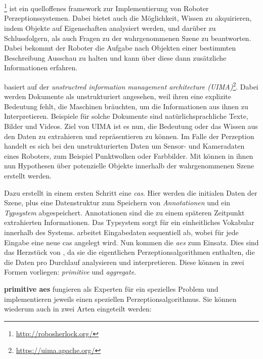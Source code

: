 \section{\robosherlock}
\label{sec:robosherlock}
\robosherlock\footnote{\url{http://robosherlock.org/}} ist ein quelloffenes \gls{framework} zur Implementierung von Roboter Perzeptionssystemen. Dabei bietet \robosherlock auch die Möglichkeit, Wissen zu akquirieren, indem Objekte auf Eigenschaften analysiert werden, und darüber zu Schlussfolgern, als auch Fragen zu der wahrgenommenen Szene zu beantworten. Dabei bekommt der Roboter die Aufgabe nach Objekten einer bestimmten Beschreibung Ausschau zu halten und kann über diese dann zusätzliche Informationen erfahren\cite{robosherlock}. \par
\robosherlock basiert auf der \textit{unstructred information management architecture (UIMA)}\footnote{\url{https://uima.apache.org/}}. Dabei werden Dokumente als unstrukturiert angesehen, weil ihren eine explizite Bedeutung fehlt, die Maschinen bräuchten, um die Informationen aus ihnen zu Interpretieren. Beispiele für solche Dokumente sind natürlichsprachliche Texte, Bilder und Videos. Ziel von UIMA ist es nun, die Bedeutung oder das Wissen aus den Daten zu extrahieren und repräsentieren zu können. \cite{UIMA} Im Falle der Perzeption handelt es sich bei den unstrukturierten Daten um Sensor- und Kameradaten eines Roboters, zum Beispiel Punktwolken oder Farbbilder. Mit \robosherlock können in ihnen nun Hypothesen über potenzielle Objekte innerhalb der wahrgenommenen Szene erstellt werden. \par
Dazu erstellt \robosherlock in einem ersten Schritt eine \textit{\gls{cas}}. Hier werden die initialen Daten der Szene, plus eine Datenstruktur zum Speichern von \textit{Annotationen} und ein \textit{Typsystem} abgespeichert. Annotationen sind die zu einem späteren Zeitpunkt extrahierten Informationen. Das Typsystem sorgt für ein einheitliches Vokabular innerhalb des Systems. \robosherlock arbeitet Eingabedaten sequentiell ab, wobei für jede Eingabe eine neue \gls{cas} angelegt wird. \newline
Nun kommen die \textit{\glspl{ae}} zum Einsatz. Dies sind das Herzstück von \robosherlock, da sie die eigentlichen Perzeptionsalgorithmen enthalten, die die Daten pro Durchlauf analysieren und interpretieren. Diese können in zwei Formen vorliegen: \textit{primitive} und \textit{aggregate}. \par
\textbf{primitive \glspl{ae}} fungieren als Experten für ein spezielles Problem und implementieren jeweils einen speziellen Perzeptionsalgorithmus. Sie können wiederum auch in zwei Arten eingeteilt werden:
